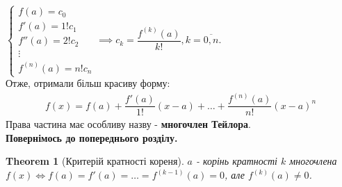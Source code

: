 \documentclass[a4paper, 10pt]{extarticle}
\theoremstyle{theoremdd}
\newtheorem{theorem}{Theorem}[subsection]
\theoremstyle{theoremdd}
\theoremstyle{theoremdd}
\theoremstyle{theoremdd}
\theoremstyle{theoremdd}
\theoremstyle{theoremdd}
\theoremstyle{theoremdd}
\theoremstyle{theoremdd}
\begin{document}
$\begin{cases}
f(a) = c_0\\
f'(a) = 1!c_1\\
f''(a) = 2!c_2\\
\vdots \\
f^{(n)}(a) = n!c_n
\end{cases} \implies c_k = \dfrac{f^{(k)}(a)}{k!}, k = \overline{0,n}$.\\
Отже, отримали більш красиву форму:
\begin{align*}
f(x) = f(a) + \dfrac{f'(a)}{1!}(x-a) + \dots + \dfrac{f^{(n)}(a)}{n!}(x-a)^n
\end{align*}
Права частина має особливу назву - \textbf{многочлен Тейлора}.
\bigskip \\
\textbf{Повернімось до попереднього розділу.}
\begin{theorem}[Критерій кратності кореня]
$a$ - корінь кратності $k$ многочлена $f(x) \iff f(a)=f'(a)=\dots=f^{(k-1)}(a) =0$, але $f^{(k)}(a) \neq 0$.
\end{theorem}
\end{document}
